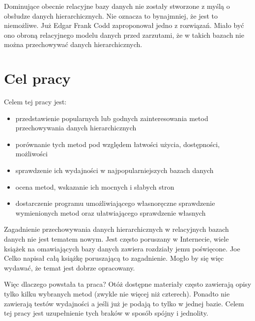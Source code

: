 Dominujące obecnie relacyjne bazy danych nie zostały stworzone z myślą o obsłudze danych hierarchicznych.
Nie oznacza to bynajmniej, że jest to niemożliwe.
Już Edgar Frank Codd zaproponował jedno z rozwiązań.
Miało być ono obroną relacyjnego modelu danych przed zarzutami,
że w takich bazach nie można przechowywać danych hierarchicznych.



\section{Cel pracy}






Celem tej pracy jest:
\begin{itemize}
    \item przedstawienie popularnych lub godnych zainteresowania metod przechowywania danych hierarchicznych
    \item porównanie tych metod pod względem łatwości użycia, dostępności, możliwości
    \item sprawdzenie ich wydajności w najpopularniejszych bazach danych
    \item ocena metod, wskazanie ich mocnych i słabych stron
    \item dostarczenie programu umożliwiającego własnoręczne sprawdzenie wymienionych metod
        oraz ułatwiającego sprawdzenie własnych
\end{itemize}


Zagadnienie przechowywania danych hierarchicznych w relacyjnych bazach danych nie jest tematem nowym.
Jest często poruszany w Internecie,
wiele książek na omawiających bazy danych zawiera rozdziały jemu poświęcone.
Joe Celko napisał całą książkę poruszającą to zagadnienie\cite{celko-tree}.
Mogło by się więc wydawać, że temat jest dobrze opracowany.

Więc dlaczego powstała ta praca?
Otóż dostępne materiały często zawierają opisy tylko kilku wybranych metod (zwykle nie więcej niż czterech).
Ponadto nie zawierają testów wydajności a jeśli już je podają to tylko w jednej bazie.
Celem tej pracy jest uzupełnienie tych braków w sposób spójny i jednolity.










